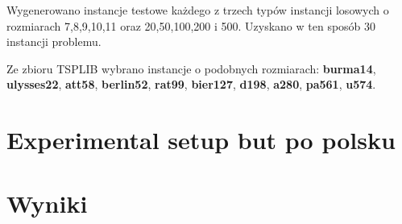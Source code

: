 Wygenerowano instancje testowe każdego z trzech typów instancji losowych o rozmiarach 7,8,9,10,11 oraz 20,50,100,200 i 500.
Uzyskano w ten sposób 30 instancji problemu.

Ze zbioru TSPLIB wybrano instancje o podobnych rozmiarach: \textbf{burma14}, \textbf{ulysses22}, \textbf{att58}, \textbf{berlin52}, \textbf{rat99},
\textbf{bier127}, \textbf{d198}, \textbf{a280}, \textbf{pa561}, \textbf{u574}.

\section{Experimental setup but po polsku}

\section{Wyniki}
